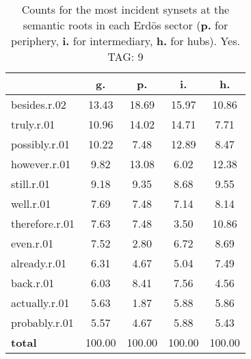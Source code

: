 \begin{table}[h!]
\begin{center}
\begin{tabular}{| l | c | c | c | c |}\hline
 & g. & p. & i. & h. \\\hline
besides.r.02 & 13.43  & 18.69  & 15.97  & 10.86 \\\hline
truly.r.01 & 10.96  & 14.02  & 14.71  & 7.71 \\\hline
possibly.r.01 & 10.22  & 7.48  & 12.89  & 8.47 \\\hline
however.r.01 & 9.82  & 13.08  & 6.02  & 12.38 \\\hline
still.r.01 & 9.18  & 9.35  & 8.68  & 9.55 \\\hline
well.r.01 & 7.69  & 7.48  & 7.14  & 8.14 \\\hline
therefore.r.01 & 7.63  & 7.48  & 3.50  & 10.86 \\\hline
even.r.01 & 7.52  & 2.80  & 6.72  & 8.69 \\\hline
already.r.01 & 6.31  & 4.67  & 5.04  & 7.49 \\\hline
back.r.01 & 6.03  & 8.41  & 7.56  & 4.56 \\\hline
actually.r.01 & 5.63  & 1.87  & 5.88  & 5.86 \\\hline
probably.r.01 & 5.57  & 4.67  & 5.88  & 5.43 \\\hline
{{\bf total}} & 100.00  & 100.00  & 100.00  & 100.00 \\\hline
\end{tabular}
\caption{Counts for the most incident synsets at the semantic roots in each Erd\"os sector ({\bf p.} for periphery, {\bf i.} for intermediary, {\bf h.} for hubs). Yes. TAG: 9}
\end{center}
\end{table}